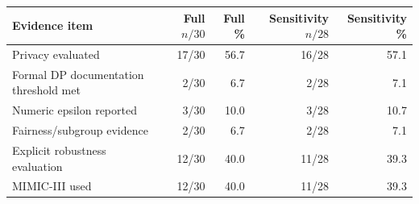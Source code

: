 \begin{tabular}{lrrrr}
\toprule
Evidence item & Full $n/30$ & Full \% & Sensitivity $n/28$ & Sensitivity \% \\
\midrule
Privacy evaluated & 17/30 & 56.7 & 16/28 & 57.1 \\
Formal DP documentation threshold met & 2/30 & 6.7 & 2/28 & 7.1 \\
Numeric epsilon reported & 3/30 & 10.0 & 3/28 & 10.7 \\
Fairness/subgroup evidence & 2/30 & 6.7 & 2/28 & 7.1 \\
Explicit robustness evaluation & 12/30 & 40.0 & 11/28 & 39.3 \\
MIMIC-III used & 12/30 & 40.0 & 11/28 & 39.3 \\
\bottomrule
\end{tabular}
